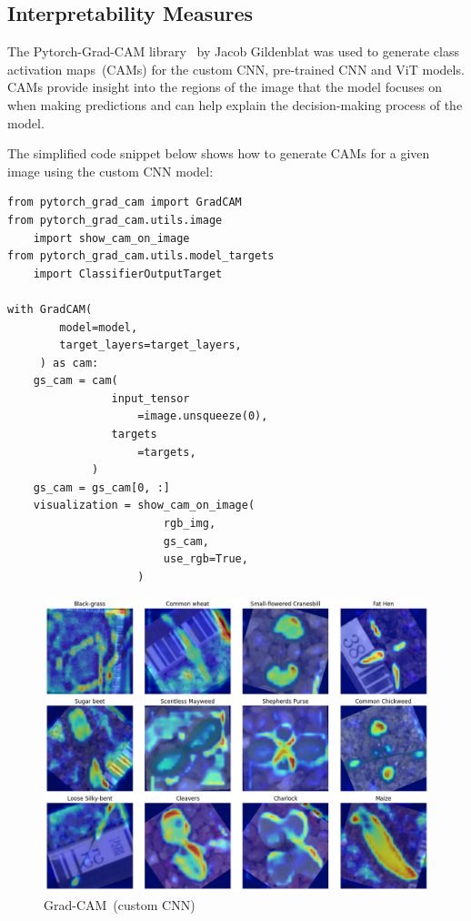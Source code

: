 \subsection{Interpretability Measures}

The Pytorch-Grad-CAM library~\cite{jacobgilpytorchcam} by Jacob Gildenblat was used to generate class activation maps~(CAMs) for the custom CNN, pre-trained CNN and ViT models. CAMs provide insight into the regions of the image that the model focuses on when making predictions and can help explain the decision-making process of the model.

The simplified code snippet below shows how to generate CAMs for a given image using the custom CNN model:

\begin{minipage}{0.9\linewidth}\begin{lstlisting}[caption={Generate CAMs using Pytorch-Grad-CAM.},label={lst:grad-cam}]
from pytorch_grad_cam import GradCAM
from pytorch_grad_cam.utils.image
    import show_cam_on_image
from pytorch_grad_cam.utils.model_targets
    import ClassifierOutputTarget

with GradCAM(
        model=model,
        target_layers=target_layers,
     ) as cam:
    gs_cam = cam(
                input_tensor
                    =image.unsqueeze(0),
                targets
                    =targets,
             )
    gs_cam = gs_cam[0, :]
    visualization = show_cam_on_image(
                        rgb_img,
                        gs_cam,
                        use_rgb=True,
                    )
\end{lstlisting}\end{minipage}

\begin{figure}[htbp]
    \centerline{\includegraphics[width=0.9\linewidth]{../../resources/custom_cnn/grad_cam.png}}
    \caption{Grad-CAM~(custom CNN)}
    \label{fig:grad-cam-custom-cnn}
\end{figure}

